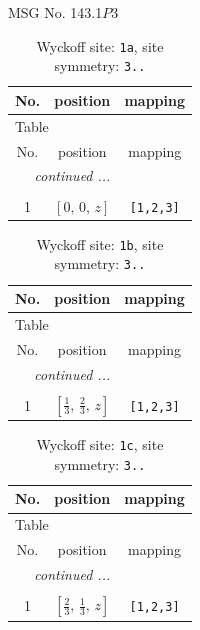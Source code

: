 \documentclass[fleqn,8pt]{jsarticle}
\begin{document}
\setcounter{MaxMatrixCols}{32}

\renewcommand{\tablename}{Table~}
\renewcommand{\figurename}{Figure~}
\begin{center}
\LARGE
MSG No. 143.1\quad$P3$
\end{center}
\renewcommand{\arraystretch}{1.2}
\begin{longtable}{ccc}
\caption{Wyckoff site: {\tt 1a}, site symmetry: {\tt 3..}}
 \\
 \hline \hline
No. & position & mapping \\ \hline \endfirsthead

\multicolumn{2}{l}{\tablename\ \thetable{}} \\
 \hline \hline
No. & position & mapping \\ \hline \endhead

 \hline \hline
\multicolumn{2}{r}{\footnotesize\it continued ...} \\ \endfoot

 \hline \hline
\multicolumn{2}{r}{} \\ \endlastfoot

1 & $\left[ 0,\, 0,\, z \right]$ & {\tt [1,2,3]} \\
\end{longtable}
\renewcommand{\arraystretch}{1.2}
\begin{longtable}{ccc}
\caption{Wyckoff site: {\tt 1b}, site symmetry: {\tt 3..}}
 \\
 \hline \hline
No. & position & mapping \\ \hline \endfirsthead

\multicolumn{2}{l}{\tablename\ \thetable{}} \\
 \hline \hline
No. & position & mapping \\ \hline \endhead

 \hline \hline
\multicolumn{2}{r}{\footnotesize\it continued ...} \\ \endfoot

 \hline \hline
\multicolumn{2}{r}{} \\ \endlastfoot

1 & $\left[ \frac{1}{3},\, \frac{2}{3},\, z \right]$ & {\tt [1,2,3]} \\
\end{longtable}
\renewcommand{\arraystretch}{1.2}
\begin{longtable}{ccc}
\caption{Wyckoff site: {\tt 1c}, site symmetry: {\tt 3..}}
 \\
 \hline \hline
No. & position & mapping \\ \hline \endfirsthead

\multicolumn{2}{l}{\tablename\ \thetable{}} \\
 \hline \hline
No. & position & mapping \\ \hline \endhead

 \hline \hline
\multicolumn{2}{r}{\footnotesize\it continued ...} \\ \endfoot

 \hline \hline
\multicolumn{2}{r}{} \\ \endlastfoot

1 & $\left[ \frac{2}{3},\, \frac{1}{3},\, z \right]$ & {\tt [1,2,3]} \\
\end{longtable}
\end{document}
